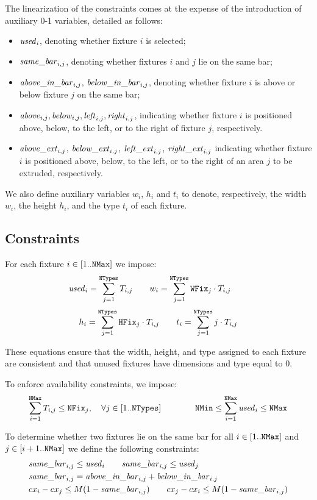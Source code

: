 The linearization of the constraints comes at the expense of the introduction of auxiliary 0-1 variables, detailed as follows:
\begin{itemize}
	\item $\mathit{used}_i$, denoting whether fixture $i$ is selected;
	\item $\mathit{same\_bar}_{i,j}$, denoting whether fixtures $i$ and $j$ lie on the same bar;
	\item $\mathit{above\_in\_bar}_{i,j}$, $\mathit{below\_in\_bar}_{i,j}$, denoting whether fixture $i$ is above or below fixture $j$ on the same bar;
	\item $\mathit{above}_{i,j}, \mathit{below}_{i,j}, \mathit{left}_{i,j}, \mathit{right}_{i,j}$, indicating whether fixture $i$ is positioned above, below, to the left, or to the right of fixture $j$, respectively.
	\item $\mathit{above\_ext}_{i,j}$, $\mathit{below\_ext}_{i,j}$, $\mathit{left\_ext}_{i,j}$, $\mathit{right\_ext}_{i,j}$ indicating whether fixture $i$ is positioned above, below, to the left, or to the right of an area $j$ to be extruded, respectively.
\end{itemize}

We also define auxiliary variables $w_i$, $h_i$ and $t_i$ to denote, respectively, the width $w_i$, the height $h_i$, and the type $t_i$ of each fixture.

\subsection{Constraints}
For each fixture $i \in [1..\mathtt{NMax}]$ we impose:
\[
\mathit{used}_i = \sum_{j=1}^{\mathtt{NTypes}} T_{i,j} \qquad
w_i = \sum_{j=1}^{\mathtt{NTypes}} \mathtt{WFix}_j\cdot T_{i,j} \qquad
\]
\[
h_i = \sum_{j=1}^{\mathtt{NTypes}} \mathtt{HFix}_j\cdot T_{i,j} \qquad
t_i = \sum_{j=1}^{\mathtt{NTypes}} j \cdot T_{i,j}
\]

These equations ensure that the width, height, and type assigned to each fixture are consistent and that unused fixtures have dimensions and type equal to $0$.

To enforce availability constraints, we impose:
\[
\sum_{i=1}^{\mathtt{NMax}} T_{i,j} \le \mathtt{NFix}_j, \quad \forall j \in [1..\mathtt{NTypes}] \qquad\qquad
\mathtt{NMin} \le \sum_{i=1}^{\mathtt{NMax}} \mathit{used}_i \le \mathtt{NMax}
\]

To determine whether two fixtures lie on the same bar for all $i \in [1..\mathtt{NMax}]$ and $j \in [i+1..\mathtt{NMax}]$ we define the following constraints:
\[
\begin{aligned}
	&\mathit{same\_bar}_{i,j} \le \mathit{used}_i \qquad \mathit{same\_bar}_{i,j} \le \mathit{used}_j \\
	&\mathit{same\_bar}_{i,j} = \mathit{above\_in\_bar}_{i,j} + \mathit{below\_in\_bar}_{i,j}\\
	&cx_i - cx_j \le M (1 - \mathit{same\_bar}_{i,j}) \qquad cx_j - cx_i \le M (1 - \mathit{same\_bar}_{i,j}) \\
\end{aligned}
\]

